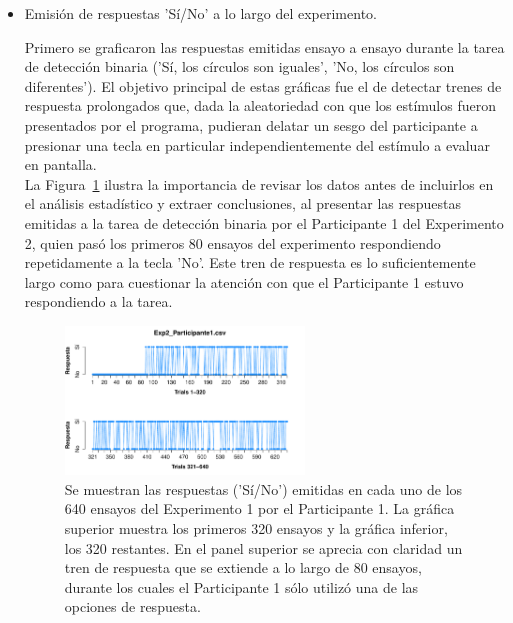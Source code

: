 \begin{itemize}
\item Emisión de respuestas 'Sí/No' a lo largo del experimento.

Primero se graficaron las respuestas emitidas ensayo a ensayo durante la tarea de detección binaria ('Sí, los círculos son iguales', 'No, los círculos son diferentes'). El objetivo principal de estas gráficas fue el de detectar trenes de respuesta prolongados que, dada la aleatoriedad con que los estímulos fueron presentados por el programa, pudieran delatar un sesgo del participante a presionar una tecla en particular independientemente del estímulo a evaluar en pantalla.\\

La Figura~\ref{fig:Resp_E1_P1} ilustra la importancia de revisar los datos antes de incluirlos en el análisis estadístico y extraer conclusiones, al presentar las respuestas emitidas a la tarea de detección binaria por el Participante 1 del Experimento 2, quien pasó los primeros 80 ensayos del experimento respondiendo repetidamente a la tecla 'No'. Este tren de respuesta es lo suficientemente largo como para cuestionar la atención con que el Participante 1 estuvo respondiendo a la tarea.\\ 

\begin{figure}[th]
\centering
\includegraphics[width=0.60\textwidth]{Figures/Response_Exp2_P1} 
\caption[Respuesta emitida por ensayo; ejemplo de participante sesgado]{Se muestran las respuestas ('Sí/No') emitidas en cada uno de los 640 ensayos del Experimento 1 por el Participante 1. La gráfica superior muestra los primeros 320 ensayos y la gráfica inferior, los 320 restantes. En el panel superior se aprecia con claridad un tren de respuesta que se extiende a lo largo de 80 ensayos, durante los cuales el Participante 1 sólo utilizó una de las opciones de respuesta.}
\label{fig:Resp_E1_P1}
\end{figure}


\end{itemize}
